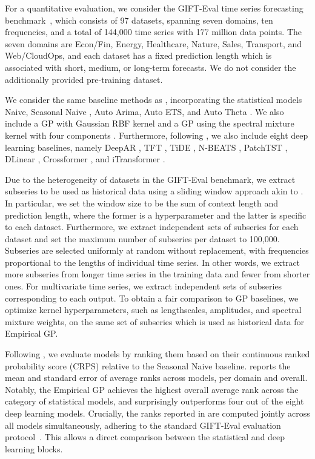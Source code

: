 \documentclass{article}
\begin{document}


For a quantitative evaluation, we consider the GIFT-Eval time series forecasting benchmark~\citep{aksu2024gifteval}, which consists of 97 datasets, spanning seven domains, ten frequencies, and a total of 144,000 time series with 177 million data points.
The seven domains are Econ/Fin, Energy, Healthcare, Nature, Sales, Transport, and Web/CloudOps, and each dataset has a fixed prediction length which is associated with short, medium, or long-term forecasts.
We do not consider the additionally provided pre-training dataset.

We consider the same baseline methods as \citet{aksu2024gifteval}, incorporating the statistical models Naive, Seasonal Naive \citep{hyndman2018forecasting}, Auto Arima, Auto ETS, and Auto Theta \citep{garza2022statsforecast}.
We also include a GP with Gaussian RBF kernel and a GP using the spectral mixture kernel with four components \citep{wilson2013gaussian}.
Furthermore, following \citet{aksu2024gifteval}, we also include eight deep learning baselines, namely DeepAR \citep{salinas2020deepar}, TFT \citep{lime2021tft}, TiDE \citep{das2023tide}, N-BEATS \citep{oreshkin2020nbeats}, PatchTST \citep{nie2023patchtst}, DLinear \citep{zeng2023transformers}, Crossformer \citep{zhang2023crossformer}, and iTransformer \citep{liu2024itransformer}.

Due to the heterogeneity of datasets in the GIFT-Eval benchmark, we extract subseries to be used as historical data using a sliding window approach akin to .
In particular, we set the window size to be the sum of context length and prediction length, where the former is a hyperparameter and the latter is specific to each dataset.
Furthermore, we extract independent sets of subseries for each dataset and set the maximum number of subseries per dataset to 100,000.
Subseries are selected uniformly at random without replacement, with frequencies proportional to the lengths of individual time series.
In other words, we extract more subseries from longer time series in the training data and fewer from shorter ones.
For multivariate time series, we extract independent sets of subseries corresponding to each output.
To obtain a fair comparison to GP baselines, we optimize kernel hyperparameters, such as lengthscales, amplitudes, and spectral mixture weights, on the same set of subseries which is used as historical data for Empirical GP.

Following \citet{aksu2024gifteval}, we evaluate models by ranking them based on their continuous ranked probability score (CRPS) relative to the Seasonal Naive baseline.
 reports the mean and standard error of average ranks across models, per domain and overall.
Notably, the Empirical GP achieves the highest overall average rank across the category of statistical models, and surprisingly outperforms four out of the eight deep learning models.
Crucially, the ranks reported in  are computed jointly across all models simultaneously, adhering to the standard GIFT-Eval evaluation protocol~\citep{aksu2024gifteval}. This allows a direct comparison between the statistical and deep learning blocks.
\end{document}
